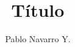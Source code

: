 \documentclass[letterpaper,12pt]{article}
\title{Título}
\author{Pablo Navarro Y.}
\date{}
\newcommand{\onlyinsubfile}[1]{#1}
\newcommand{\notinsubfile}[1]{}
\begin{document}
\renewcommand{\onlyinsubfile}[1]{}
\renewcommand{\notinsubfile}[1]{#1}

\maketitle
\tableofcontents
\listofclases
\end{document}
